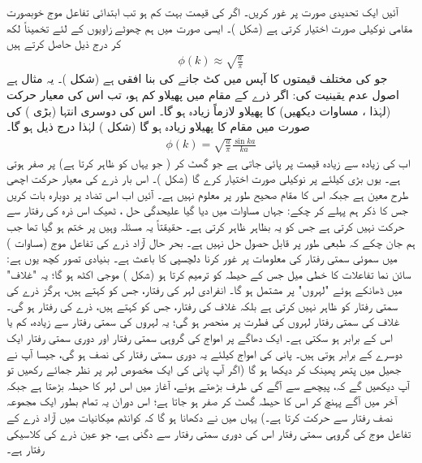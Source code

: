 آئیں ایک تحدیدی صورت پر غور کریں۔ اگر  کی قیمت بہت کم ہو تب ابتدائی تفاعل موج  خوبصورت مقامی نوکیلی صورت اختیار کرتی ہے (شکل )۔ ایسی صورت میں ہم چھوٹے زاویوں کے لئے تخمیناً   لکھ کر درج ذیل حاصل کرتے ہیں
\begin{align*}
\phi (k)  \approx \sqrt{\frac{a}{\pi}}
\end{align*}
جو   کی مختلف قیمتوں کا آپس میں کٹ جانے کی بنا افقی ہے (شکل )۔ یہ مثال ہے اصول عدم یقینیت  کی: اگر ذرے کے مقام میں پھیلاو  کم ہو،  تب اس کی معیار حرکت (لہٰذا ، مساوات  دیکھیں) کا پھیلاو  لازماً زیادہ ہو گا۔ اس کی دوسری انتہا  (بڑی  ) کی صورت میں مقام کا پھیلاو  زیادہ  ہو گا (شکل ) لہٰذا درج ذیل ہو گا۔ 
\begin{align*}
\phi (k)  = \sqrt{\frac{a}{\pi}} \frac{\sin ka }{ka }
\end{align*}
اب  کی زیادہ سے زیادہ قیمت     پر پائی جاتی ہے جو گھٹ کر   ( جو یہاں  کو ظاہر کرتا ہے) پر  صفر ہوتی ہے۔ یوں بڑی  کیلئے  پر  نوکیلی صورت اختیار کرے گا (شکل )۔   اس بار ذرے کی معیار حرکت اچھی طرح معین ہے جبکہ اس کا مقام صحیح طور پر معلوم نہیں ہے۔
آئیں اب اس تضاد پر دوبارہ بات کریں جس کا ذکر ہم پہلے کر چکے: جہاں مساوات  میں دیا گیا علیحدگی   حل ، ٹھیک اس ذرہ کی رفتار سے حرکت نہیں کرتی ہے جس کو یہ بظاہر ظاہر کرتی ہے۔ حقیقتاً  یہ مسئلہ وہیں پر ختم ہو گیا تھا جب ہم جان چکے کہ  طبعی طور پر قابل حصول حل نہیں ہے۔ بحر حال آزاد ذرے کی تفاعل موج (مساوات ) میں سموئی سمتی رفتار کی معلومات پر غور کرنا دلچسپی کا باعث ہے۔ بنیادی تصور کچھ یوں ہے: سائن نما تفاعلات کا خطی میل جس کے حیطہ کو  ترمیم کرتا ہو (شکل )   موجی اکٹھ ہو گا؛ یہ "غلاف" میں ڈھانکے ہوئے "لہروں" پر مشتمل ہو گا۔ انفرادی لہر کی رفتار، جس کو  کہتے ہیں، ہرگز ذرے کی سمتی رفتار کو ظاہر نہیں کرتی ہے بلکہ غلاف کی رفتار، جس کو  کہتے ہیں، ذرے کی رفتار ہو گی۔ غلاف کی سمتی رفتار لہروں کی فطرت پر منحصر ہو گی؛  یہ لہروں کی سمتی رفتار سے زیادہ، کم یا اس کے برابر ہو سکتی  ہے۔ ایک دھاگے پر امواج کی گروہی سمتی رفتار اور دوری سمتی رفتار  ایک دوسرے کے برابر ہوتی ہیں۔ پانی کی امواج کیلئے یہ دوری سمتی رفتار کی نصف ہو گی، جیسا آپ نے جھیل میں پتھر پھینک کر دیکھا ہو گا (اگر آپ پانی کی ایک مخصوص لہر پر نظر جمائے رکھیں تو آپ دیکھیں گے کہ، پیچھے سے آگے کی طرف بڑھتے ہوئے، آغاز میں اس لہر کا حیطہ  بڑھتا ہے جبکہ آخر میں آگے پہنچ کر اس کا حیطہ گھٹ کر صفر ہو جاتا ہے؛ اس دوران یہ تمام بطور ایک مجموعہ  نصف رفتار سے حرکت کرتا ہے۔) یہاں میں نے دکھانا ہو گا کہ کوانٹم میکانیات میں آزاد ذرے کے تفاعل موج کی گروہی سمتی رفتار اس کی دوری سمتی رفتار سے دگنی ہے، جو عین ذرے کی کلاسیکی  رفتار ہے۔

